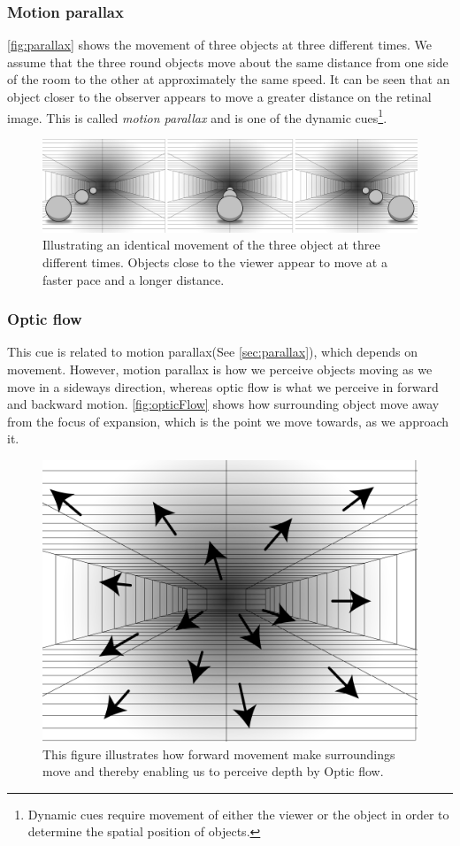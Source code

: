 \subsubsection{Motion parallax}\label{sec:parallax}
\autoref{fig:parallax} shows the movement of three objects at three different times. We assume that the three round objects move about the same distance from one side of the room to the other at approximately the same speed. It can be seen that an object closer to the observer appears to move a greater distance on the retinal image. This is called \textit{motion parallax} and is one of the dynamic cues\footnote{Dynamic cues require movement of either the viewer or the object in order to determine the spatial position of objects\citep{sensationPerception}.}\citep[p.~204]{sensationPerception}.
\begin{figure}[H]
	\centering
	\includegraphics[width=1\linewidth]{figure/Analysis/parallax.png}
	\caption{Illustrating an identical movement of the three object at three different times. Objects close to the viewer appear to move at a faster pace and a longer distance.}
	\label{fig:parallax}
\end{figure}

\subsubsection{Optic flow}
This cue is related to motion parallax(See \autoref{sec:parallax}), which depends on movement. However, motion parallax is how we perceive objects moving as we move in a sideways direction, whereas optic flow is what we perceive in forward and backward motion. \autoref{fig:opticFlow} shows how surrounding object move away from the focus of expansion, which is the point we move towards, as we approach it.\citep[p.~205]{sensationPerception}
\begin{figure}[H]
	\centering
	\includegraphics[width=0.6\linewidth]{figure/Analysis/opticFlow.png}
	\caption{This figure illustrates how forward movement make surroundings move and thereby enabling us to perceive depth by Optic flow.}
	\label{fig:opticFlow}
\end{figure}

